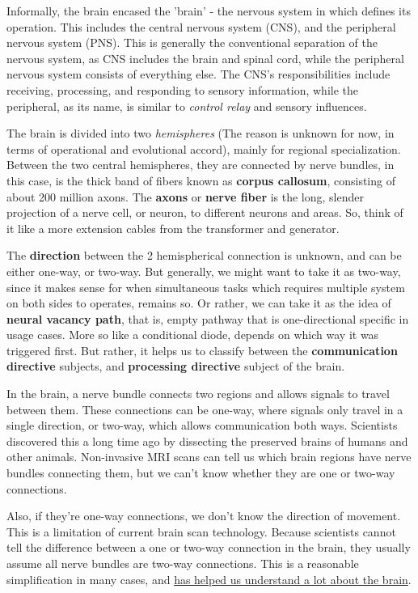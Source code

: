 Informally, the brain encased the 'brain' - the nervous system in which defines its operation. This includes the central nervous system (CNS), and the peripheral nervous system (PNS). This is generally the conventional separation of the nervous system, as CNS includes the brain and spinal cord, while the peripheral nervous system consists of everything else. The CNS's responsibilities include receiving, processing, and responding to sensory information, while the peripheral, as its name, is similar to \textit{control relay} and sensory influences. 

The brain is divided into two \textit{hemispheres} (The reason is unknown for now, in terms of operational and evolutional accord), mainly for regional specialization. Between the two central hemispheres, they are connected by nerve bundles, in this case, is the thick band of fibers known as \textbf{corpus callosum}, consisting of about 200 million axons. The \textbf{axons} or \textbf{nerve fiber} is the long, slender projection of a nerve cell, or neuron, to different neurons and areas. So, think of it like a more extension cables from the transformer and generator. 

The \textbf{direction} between the 2 hemispherical connection is unknown, and can be either one-way, or two-way. But generally, we might want to take it as two-way, since it makes sense for when simultaneous tasks which requires multiple system on both sides to operates, remains so. Or rather, we can take it as the idea of \textbf{neural vacancy path}, that is, empty pathway that is one-directional specific in usage cases. More so like a conditional diode, depends on which way it was triggered first. But rather, it helps us to classify between the \textbf{communication directive} subjects, and \textbf{processing directive} subject of the brain. 

\begin{note}
    In the brain, a nerve bundle connects two regions and allows signals to travel between them.
 These connections can be one-way, where signals only travel in a single direction, or two-way, which allows communication both ways. Scientists discovered this a long time ago by dissecting the preserved brains of humans and other animals. Non-invasive MRI scans can tell us which brain regions have nerve bundles connecting them, but we can't know whether they are one or two-way connections.
 \vspace{2mm}

 Also, if they're one-way connections, we don't know the direction of movement. This is a limitation of current brain scan technology. Because scientists cannot tell the difference between a one or two-way connection in the brain, they usually assume all nerve bundles are two-way connections. This is a reasonable simplification in many cases, and \href{https://www.nature.com/articles/nrn3901}{has helped us understand a lot about the brain}.
\end{note}

